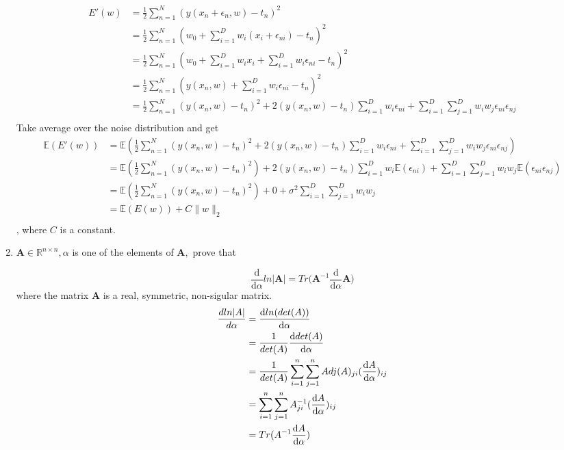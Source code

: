 \documentclass[12pt, a4paper]{article}
\begin{document}
\begin{enumerate}
\begin{align*}
    E'(w) &= \frac{1}{2}\sum\limits^N_{n=1}(y(x_n + \epsilon_n, w) - t_n)^2\\
    &= \frac{1}{2}\sum\limits^N_{n=1}(w_0 + \sum\limits^D_{i=1}w_i(x_i+\epsilon_{ni}) - t_n)^2\\
    &= \frac{1}{2}\sum\limits^N_{n=1}(w_0 + \sum\limits^D_{i=1}w_ix_i +\sum\limits^D_{i=1}w_i\epsilon_{ni} - t_n)^2\\
    &= \frac{1}{2}\sum\limits^N_{n=1}(y(x_n, w) +\sum\limits^D_{i=1}w_i\epsilon_{ni} - t_n)^2\\
    &= \frac{1}{2}\sum\limits^N_{n=1}(y(x_n, w) - t_n)^2 + 2(y(x_n,w)-t_n)\sum\limits^D_{i=1}w_i\epsilon_{ni} + \sum\limits^D_{i=1}\sum\limits^D_{j=1}w_iw_j\epsilon_{ni}\epsilon_{nj}\\
\end{align*}
Take average over the noise distribution and get
\begin{align*}
    \mathbb{E}(E'(w)) &= \mathbb{E}\left(\frac{1}{2}\sum\limits^N_{n=1}(y(x_n, w) - t_n)^2 + 2(y(x_n,w)-t_n)\sum\limits^D_{i=1}w_i\epsilon_{ni} + \sum\limits^D_{i=1}\sum\limits^D_{j=1}w_iw_j\epsilon_{ni}\epsilon_{nj}\right)\\
    &= \mathbb{E}\left(\frac{1}{2}\sum\limits^N_{n=1}(y(x_n, w) - t_n)^2\right) + 2(y(x_n,w)-t_n)\sum\limits^D_{i=1}w_i\mathbb{E}(\epsilon_{ni}) + \sum\limits^D_{i=1}\sum\limits^D_{j=1}w_iw_j\mathbb{E}(\epsilon_{ni}\epsilon_{nj})\\
    &= \mathbb{E}\left(\frac{1}{2}\sum\limits^N_{n=1}(y(x_n, w) - t_n)^2\right) + 0 + \sigma^2\sum\limits^D_{i=1}\sum\limits^D_{j=1}w_iw_j\\
    &= \mathbb{E}(E(w)) + C \|w\|_2\\
\end{align*}
, where $C$ is a constant.

\item $\mathbf A \in \mathbb R^{n \times n},  \alpha$ is one of the elements of $\mathbf A,$ prove that

$$\frac {\mathrm d} {\mathrm d \alpha } ln|\mathbf A| = Tr\bigg(\mathbf A^{-1} \frac {\mathrm d} {\mathrm d \alpha} \mathbf A \bigg) $$
where the matrix $\mathbf A$ is a real, symmetric, non-sigular matrix.\\

\begin{align*}
    \frac{d ln|A|}{d\alpha} &= \dv{ln(det(A))}{\alpha}\\
    &= \frac{1}{det(A)}\dv{det(A)}{\alpha}\\
    &= \frac{1}{det(A)} \sum\limits^n_{i=1}\sum^n_{j=1}Adj(A)_{ji}(\dv{A}{\alpha})_{ij}\\
    &= \sum\limits^n_{i=1}\sum^n_{j=1}A^{-1}_{ji}(\dv{A}{\alpha})_{ij}\\
    &= Tr(A^{-1}\dv{A}{\alpha})\\
\end{align*}


\end{enumerate}
\end{document}

